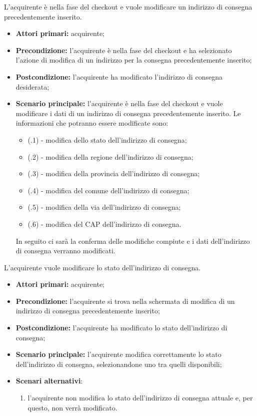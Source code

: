 L'acquirente è nella fase del checkout e vuole modificare un indirizzo di consegna precedentemente inserito.
\begin{itemize}
    \item \textbf{Attori primari:} acquirente;
    \item \textbf{Precondizione:} l'acquirente è nella fase del checkout e ha selezionato l'azione di modifica di un indirizzo per la consegna precedentemente inserito;
    \item \textbf{Postcondizione:} l'acquirente ha modificato l'indirizzo di consegna desiderata;
    \item \textbf{Scenario principale:} l'acquirente è nella fase del checkout e vuole modificare i dati di un indirizzo di consegna precedentemente inserito. Le informazioni che potranno essere modificate sono:
    \begin{itemize}
        \item (\actualUC.1) - modifica dello stato dell'indirizzo di consegna;
		\item (\actualUC.2) - modifica della regione dell'indirizzo di consegna;
		\item (\actualUC.3) - modifica della provincia dell'indirizzo di consegna;
		\item (\actualUC.4) - modifica del comune dell'indirizzo di consegna;
		\item (\actualUC.5) - modifica della via dell'indirizzo di consegna;
		\item (\actualUC.6) - modifica del CAP dell'indirizzo di consegna.
    \end{itemize}
    In seguito ci sarà la conferma delle modifiche compiute e i dati dell'indirizzo di consegna verranno modificati.
\end{itemize}

\resetSubUC

L'acquirente vuole modificare lo stato dell'indirizzo di consegna.
\begin{itemize}
    \item \textbf{Attori primari:} acquirente;
    \item \textbf{Precondizione:} l'acquirente si trova nella schermata di modifica di un indirizzo di consegna precedentemente inserito;
    \item \textbf{Postcondizione:} l'acquirente ha modificato lo stato dell'indirizzo di consegna;
    \item \textbf{Scenario principale:} l'acquirente modifica correttamente lo stato dell'indirizzo di consegna, selezionandone uno tra quelli disponibili;
    \item \textbf{Scenari alternativi}:
    \begin{enumerate}[label=\lett]
        \item l'acquirente non modifica lo stato dell'indirizzo di consegna attuale e, per questo, non verrà modificato.
    \end{enumerate}
\end{itemize}

